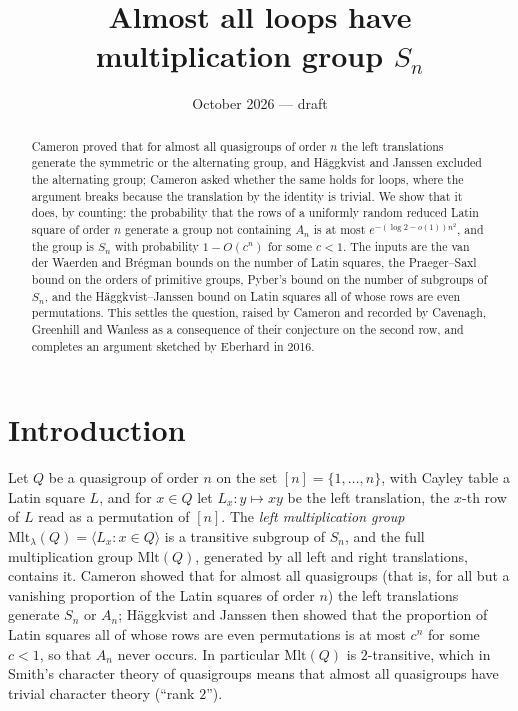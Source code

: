 \documentclass[11pt]{amsart}
\title{Almost all loops have multiplication group $S_n$}
\author{}
\date{October 2026 --- draft}
\theoremstyle{plain}
\theoremstyle{remark}
\newcommand{\Mlt}{\mathrm{Mlt}}
\begin{document}
\maketitle

\begin{abstract}
Cameron proved that for almost all quasigroups of order $n$ the left
translations generate the symmetric or the alternating group, and
H\"aggkvist and Janssen excluded the alternating group; Cameron asked
whether the same holds for loops, where the argument breaks because the
translation by the identity is trivial.  We show that it does, by counting: the
probability that the rows of a uniformly random reduced Latin square of
order $n$ generate a group not containing $A_n$ is at most
$e^{-(\log 2-o(1))n^2}$, and the group is $S_n$ with probability
$1-O(c^n)$ for some $c<1$.  The inputs are the van der Waerden and
Br\'egman bounds on the number of Latin squares, the Praeger--Saxl bound
on the orders of primitive groups, Pyber's bound on the number of
subgroups of $S_n$, and the H\"aggkvist--Janssen bound on Latin squares
all of whose rows are even permutations.  This settles the question,
raised by Cameron and recorded by Cavenagh, Greenhill and Wanless as a
consequence of their conjecture on the second row, and completes an
argument sketched by Eberhard in 2016.
\end{abstract}

\section{Introduction}

Let $Q$ be a quasigroup of order $n$ on the set $[n]=\{1,\dots,n\}$,
with Cayley table a Latin square $L$, and for $x\in Q$ let
$L_x\colon y\mapsto xy$ be the left translation, the $x$-th row of $L$
read as a permutation of $[n]$.  The \emph{left multiplication group}
$\Mlt_\lambda(Q)=\langle L_x:x\in Q\rangle$ is a transitive subgroup
of $S_n$, and the full multiplication group $\Mlt(Q)$, generated by all
left and right translations, contains it.  Cameron \cite{Cam92} showed
that for almost all quasigroups (that is, for all but a vanishing
proportion of the Latin squares of order $n$) the left translations
generate $S_n$ or $A_n$; H\"aggkvist and Janssen \cite{HJ96} then showed
that the proportion of Latin squares all of whose rows are even
permutations is at most $c^n$ for some $c<1$, so that $A_n$ never
occurs.  In particular $\Mlt(Q)$ is $2$-transitive, which in Smith's
character theory of quasigroups \cite{Smith} means that almost all
quasigroups have trivial character theory (``rank $2$'').
\end{document}
